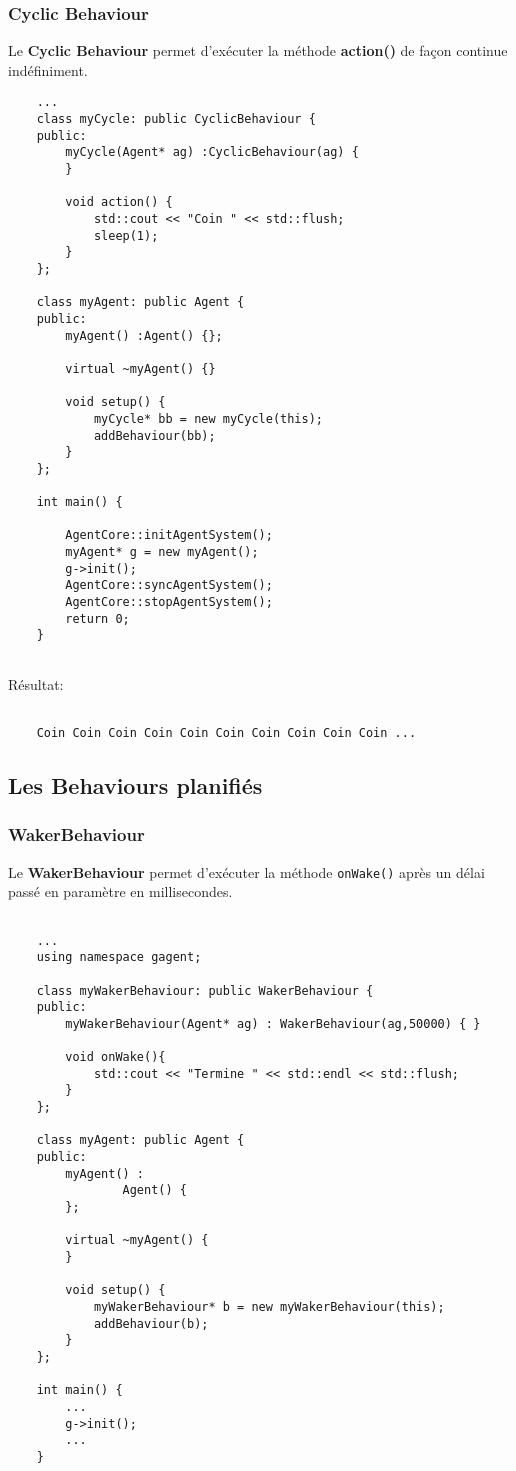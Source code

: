 \subsubsection{Cyclic Behaviour}

Le \textbf{Cyclic Behaviour} permet d'exécuter la méthode \textbf{action()} de façon continue indéfiniment. 

\begin{lstlisting}
	...
	class myCycle: public CyclicBehaviour {
	public:
		myCycle(Agent* ag) :CyclicBehaviour(ag) {
		}

		void action() {
			std::cout << "Coin " << std::flush;
			sleep(1);
		}
	};

	class myAgent: public Agent {
	public:
		myAgent() :Agent() {};

		virtual ~myAgent() {}

		void setup() {
			myCycle* bb = new myCycle(this);
			addBehaviour(bb);
		}
	};

	int main() {

		AgentCore::initAgentSystem();
		myAgent* g = new myAgent();
		g->init();
		AgentCore::syncAgentSystem();
		AgentCore::stopAgentSystem();
		return 0;
	}
	
\end{lstlisting}

Résultat:

\begin{lstlisting}[backgroundcolor=\color{green!5}]

	Coin Coin Coin Coin Coin Coin Coin Coin Coin Coin ...

\end{lstlisting}



\subsection{Les Behaviours planifiés}

\subsubsection{WakerBehaviour}

Le \textbf{WakerBehaviour} permet d'exécuter la méthode \texttt{onWake()} après un délai passé en paramètre en millisecondes.

\begin{lstlisting}

	...
	using namespace gagent;

	class myWakerBehaviour: public WakerBehaviour {
	public:
		myWakerBehaviour(Agent* ag) : WakerBehaviour(ag,50000) { }

		void onWake(){
			std::cout << "Termine " << std::endl << std::flush;
		}
	};

	class myAgent: public Agent {
	public:
		myAgent() :
				Agent() {
		};

		virtual ~myAgent() {
		}

		void setup() {
			myWakerBehaviour* b = new myWakerBehaviour(this);
			addBehaviour(b);
		}
	};

	int main() {
		...
		g->init();
		...
	}

\end{lstlisting}

